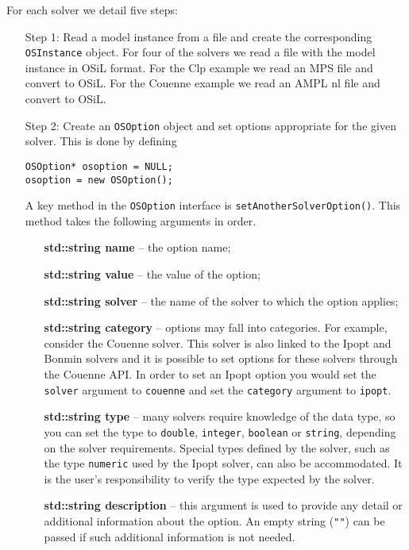\documentclass[11pt]{article}
\renewcommand{\_}{{\char"5F}}
\renewcommand{\{}{{\char"7B}}
\renewcommand{\}}{{\char"7D}}
\renewcommand{\^}{{\char"0D}}
\renewcommand{\'}{{\char"0D}}
\begin{document}
For each solver we detail five steps:

\begin{itemize}
\item[Step 1:]  Read a model instance from a file  and create the corresponding {\tt OSInstance} object.
For four of the solvers we read a file with the model instance in OSiL format. For the Clp example 
we read an MPS file and convert to OSiL. For the Couenne example we read an AMPL nl file and convert 
to OSiL.

\item[Step 2:]  Create an {\tt OSOption} object and set options appropriate for the given solver.   
This is done by defining

\begin{verbatim}
OSOption* osoption = NULL;
osoption = new OSOption();
\end{verbatim}

A key method in the {\tt OSOption} interface is {\tt setAnotherSolverOption()}.  This method 
takes the following arguments in order.

\begin{itemize}
\item[] {\bf std::string name} -- the option name;
\item[] {\bf std::string value}  -- the value of the option;
\item[] {\bf std::string solver} -- the name of the solver to which the option applies;
\item[] {\bf std::string category} -- options may fall into categories. For example, consider the  
Couenne solver.  This solver is also linked to the Ipopt and Bonmin solvers and  it is possible 
to set options for these solvers through the Couenne API. In order to set an Ipopt option 
you would set the {\tt solver} argument to {\tt couenne} and set the {\tt category} argument 
to {\tt ipopt}.

\item[] {\bf std::string type} -- many solvers require knowledge of the data type, so you can set 
the type to {\tt double}, {\tt integer}, {\tt boolean} or {\tt string}, depending on the solver 
requirements. Special types defined by the solver, such as the type {\tt numeric} used by the
Ipopt solver, can also be accommodated. It is the user's responsibility to verify the type
expected by the solver.


\item[] {\bf std::string  description} -- this argument is used to provide any detail or 
additional information about the option. An empty string ({\tt""}) can be passed if such additional
information is not needed.
\end{itemize}


\end{itemize}
\end{document}
